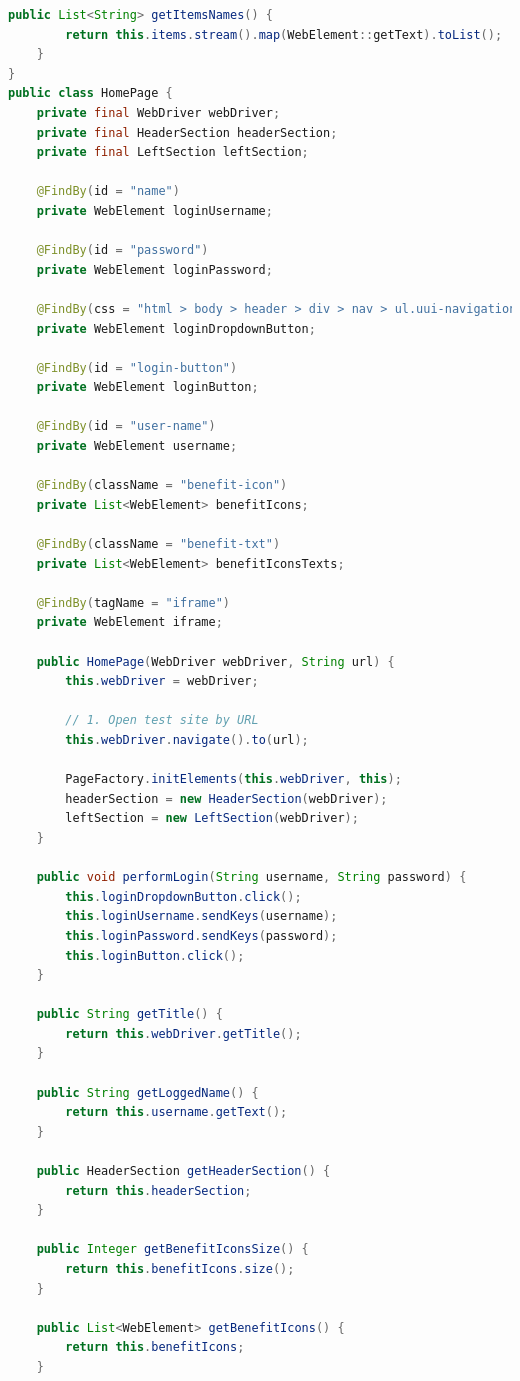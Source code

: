 \documentclass[a4paper]{article}
\begin{document}
\begin{lstlisting}[language=Java]
    public List<String> getItemsNames() {
        return this.items.stream().map(WebElement::getText).toList();
    }
}
public class HomePage {
    private final WebDriver webDriver;
    private final HeaderSection headerSection;
    private final LeftSection leftSection;

    @FindBy(id = "name")
    private WebElement loginUsername;

    @FindBy(id = "password")
    private WebElement loginPassword;

    @FindBy(css = "html > body > header > div > nav > ul.uui-navigation.navbar-nav.navbar-right > li > a > span")
    private WebElement loginDropdownButton;

    @FindBy(id = "login-button")
    private WebElement loginButton;

    @FindBy(id = "user-name")
    private WebElement username;

    @FindBy(className = "benefit-icon")
    private List<WebElement> benefitIcons;

    @FindBy(className = "benefit-txt")
    private List<WebElement> benefitIconsTexts;

    @FindBy(tagName = "iframe")
    private WebElement iframe;

    public HomePage(WebDriver webDriver, String url) {
        this.webDriver = webDriver;

        // 1. Open test site by URL
        this.webDriver.navigate().to(url);

        PageFactory.initElements(this.webDriver, this);
        headerSection = new HeaderSection(webDriver);
        leftSection = new LeftSection(webDriver);
    }

    public void performLogin(String username, String password) {
        this.loginDropdownButton.click();
        this.loginUsername.sendKeys(username);
        this.loginPassword.sendKeys(password);
        this.loginButton.click();
    }

    public String getTitle() {
        return this.webDriver.getTitle();
    }

    public String getLoggedName() {
        return this.username.getText();
    }

    public HeaderSection getHeaderSection() {
        return this.headerSection;
    }

    public Integer getBenefitIconsSize() {
        return this.benefitIcons.size();
    }

    public List<WebElement> getBenefitIcons() {
        return this.benefitIcons;
    }


\end{lstlisting}
\end{document}
